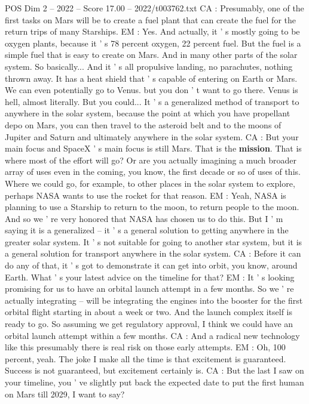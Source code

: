 \begin{textsample}{POS Dim 2 – 2022 – Score 17.00 – 2022/t003762.txt}
CA : Presumably, one of the first tasks on Mars will be to create a fuel plant that can create the fuel for the return trips of many Starships.
EM : Yes.
And actually, it ' s mostly going to be oxygen plants, because it ' s 78 percent oxygen, 22 percent fuel.
But the fuel is a simple fuel that is easy to create on Mars.
And in many other parts of the solar system.
So basically...
And it ' s all propulsive landing, no parachutes, nothing thrown away.
It has a heat shield that ' s capable of entering on Earth or Mars.
We can even potentially go to Venus. but you don ' t want to go there.
Venus is hell, almost literally.
But you could...
It ' s a generalized method of transport to anywhere in the solar system, because the point at which you have propellant depo on Mars, you can then travel to the asteroid belt and to the moons of Jupiter and Saturn and ultimately anywhere in the solar system.
CA : But your main focus and SpaceX ' s main focus is still Mars.
That is the \textbf{mission}.
That is where most of the effort will go?
Or are you actually imagining a much broader array of uses even in the coming, you know, the first decade or so of uses of this.
Where we could go, for example, to other places in the solar system to explore, perhaps NASA wants to use the rocket for that reason.
EM : Yeah, NASA is planning to use a Starship to return to the moon, to return people to the moon.
And so we ' re very honored that NASA has chosen us to do this.
But I ' m saying it is a generalized -- it ' s a general solution to getting anywhere in the greater solar system.
It ' s not suitable for going to another star system, but it is a general solution for transport anywhere in the solar system.
CA : Before it can do any of that, it ' s got to demonstrate it can get into orbit, you know, around Earth.
What ' s your latest advice on the timeline for that?
EM : It ' s looking promising for us to have an orbital launch attempt in a few months.
So we ' re actually integrating -- will be integrating the engines into the booster for the first orbital flight starting in about a week or two.
And the launch complex itself is ready to go.
So assuming we get regulatory approval, I think we could have an orbital launch attempt within a few months.
CA : And a radical new technology like this presumably there is real risk on those early attempts.
EM : Oh, 100 percent, yeah.
The joke I make all the time is that excitement is guaranteed.
Success is not guaranteed, but excitement certainly is.
CA : But the last I saw on your timeline, you ' ve slightly put back the expected date to put the first human on Mars till 2029, I want to say?

\end{textsample}
